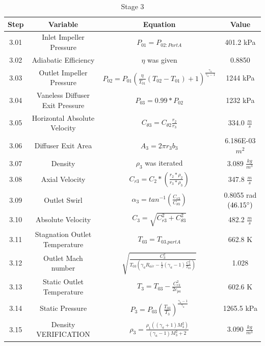 \documentclass[12pt, letter]{report}
\begin{document}
\begin{table}[H]
    \centering
\caption{Stage 3  \cite{lectureslides}}
\label{tab:stage 3}
    \begin{tabular}{|c|c|c|c|} \hline 
        \textbf{Step} &\textbf{Variable}&  \textbf{Equation}& \textbf{Value}\\ \hline  
         3.01&  Inlet Impeller Pressure&  $P_{01} = P_{02:Part A}$& 401.2 kPa\\ \hline 
         3.02&  Adiabatic Efficiency&  $\eta$ was given& 0.8850\\ \hline 
         3.03&  Outlet Impeller Pressure&  $P_{02} = P_{01}\left(\frac{\eta}{T_{01}} \left(T_{02} - T_{01}\right) + 1 \right)^{\frac{\gamma_{a}}{\gamma_{a} - 1}}$& 1244 kPa\\ \hline 
         3.04&  Vaneless Diffuser Exit Pressure&  $P_{03} = 0.99 * P_{02}$& 1232 kPa\\ \hline 
         3.05&  Horizontal Absolute Velocity&  $C_{\theta3} = C_{\theta2} \frac{r_{2}}{r_{3}} $& 334.0 $\frac{m}{s}$\\ \hline 
         3.06&  Diffuser Exit Area&  $ A_{3} = 2 \pi r_{3} b_{3} $& 6.186E-03 $m^{2}$\\ \hline 
         3.07&  Density&  $\rho_{3}$ was iterated& 3.089 $\frac{kg}{m^{3}}$\\ \hline 
         3.08&  Axial Velocity& $C_{r3} = C_2 * \left(\frac{r_2 * \rho_{2}}{r_3 * \rho_{3}} \right)$&  347.8  $\frac{m}{s}$\\ \hline 
         3.09&  Outlet Swirl&  $\alpha_{3} = tan^{-1}\left(\frac{C_{r3}}{C_{\theta3
         }}\right)$& 0.8055 rad  $(46.15\degree)$\\ \hline
 3.10& Absolute Velocity& $C_{3} = \sqrt{C_{r3}^{2} + C_{\theta3}^{2}}$&482.2 $\frac{m}{s}$\\\hline
 3.11& Stagnation Outlet Temperature& $T_{03}=T_{03.partA}$&662.8 K\\\hline
 3.12& Outlet Mach number& $\sqrt{\frac{C_{3}^{2}}{T_{03}\left(\gamma_{a}R_{air} - \frac{1}{2}\left(\gamma_{a} - 1\right)\frac{C_{3}^2}{T_{03}}\right)}}$&1.028\\ \hline 
 3.13& Static Outlet Temperature& $T_{3} = T_{03} - \frac{C_{r3}^{2}}{2c_{pa}}$&602.6 K\\\hline
 3.14& Static Pressure& $P_{3} = P_{03}\left(\frac{T_{03}}{T_{3}}\right)^{\frac{\gamma_{a} - 1}{\gamma_{a}}}$&1265.5 kPa\\\hline
 3.15& Density VERIFICATION& $\rho_{3} = \frac{\rho_{1}\left(\left(\gamma_{a} + 1\right)M_{3}^{2}\right)}{\left(\gamma_{a} - 1\right)M_{3}^{2} + 2}$&3.090 $\frac{kg}{m^{3}}$\\\hline

\end{tabular}
\end{table}
\end{document}

